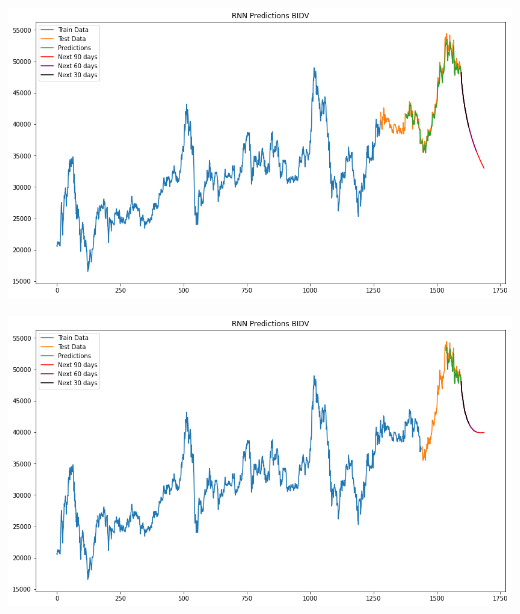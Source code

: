 \documentclass[conference]{IEEEtran}
\begin{document}
\begin{minipage}{0.21\textwidth}
    \centering
    \includegraphics[width=\linewidth]{images/RNN/RNN_BIDV_82.png}
    \label{fig:image1}
\end{minipage}
\hfill
\begin{minipage}{0.21\textwidth}
    \centering
    \includegraphics[width=\linewidth]{images/RNN/RNN_BIDV_91.png}
    \label{fig:image2}
\end{minipage}
\end{document}
